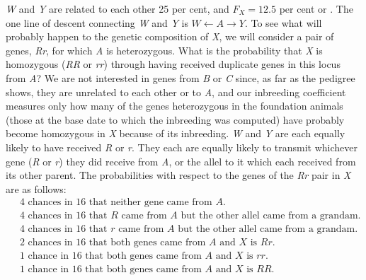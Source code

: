 \noindent
\textit{W} and \textit{Y} are related to each other 25 per cent, and
\(F_X = 12.5\) per cent or . The one line of descent connecting
\textit{W} and \textit{Y} is \(W \leftarrow A \rightarrow Y\). To
see what will probably happen to the genetic composition of \textit{X}, we will
consider a pair of genes, \textit{Rr}, for which \textit{A} is heterozygous.
What is the probability that \textit{X} is homozygous (\textit{RR} or
\textit{rr}) through having received duplicate genes in this locus from
\textit{A}? We are not interested in genes
from \textit{B} or \textit{C} since, as far as the pedigree shows, they are unrelated to
each other or to \textit{A}, and our inbreeding coefficient measures only how
many of the genes heterozygous in the foundation animals (those at the
base date to which the inbreeding was computed) have probably
become homozygous in \textit{X} because of its inbreeding. \textit{W} and \textit{Y} are each
equally likely to have received \textit{R} or \textit{r}. They each are equally likely to
transmit whichever gene (\textit{R} or \textit{r}) they did receive from \textit{A}, or the allel to
it which each received from its other parent. The probabilities with
respect to the genes of the \textit{Rr} pair in \textit{X} are as follows:
\begin{align*}
 ~&\text{4 chances in 16 that neither gene came from } A\text{.} \\
 ~&\text{4 chances in 16 that } R \text{ came from } A \text{ but the other allel came from a
grandam.} \\
 ~&\text{4 chances in 16 that } r \text{ came from } A \text{ but the other allel came from a
grandam.} \\
 ~&\text{2 chances in 16 that both genes came from } A \text{ and } X \text{ is } Rr\text{.} \\
 ~&\text{1 chance in 16 that both genes came from } A \text{ and } X \text{ is } rr\text{.} \\
 ~&\text{1 chance in 16 that both genes came from } A \text{ and } X \text{ is } RR\text{.}
\end{align*}

